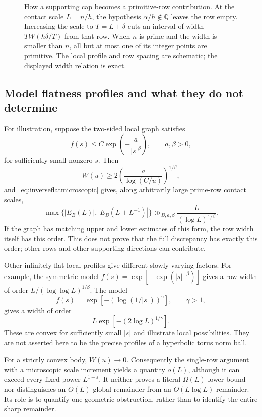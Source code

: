 \documentclass[11pt,a4paper]{article}
\numberwithin{equation}{section}
\theoremstyle{definition}
\theoremstyle{remark}
\begin{document}
\begin{figure}[htbp]
\caption[A flat supporting cap and a primitive-row burst]{How a supporting cap becomes a primitive-row contribution.
At the contact scale $L=n/h$, the hypothesis $\alpha/h\notin\mathbb Q$
leaves the row empty. Increasing the scale to $T=L+\delta$ cuts an interval
of width $TW(h\delta/T)$ from that row. When $n$ is prime and the width
is smaller than $n$, all but at most one of its integer points are
primitive. The local profile and row spacing are schematic; the
displayed width relation is exact.}
\label{fig:mono-flat-row}
\end{figure}

\subsection{Model flatness profiles and what they do not determine}
\label{subsec:flatnessmodels}

For illustration, suppose the two-sided local graph satisfies
\[
 f(s)\leq C\exp\!\left(-\frac a{|s|^\beta}\right),
 \qquad a,\beta>0,
\]
for sufficiently small nonzero $s$. Then
\[
 W(u)\geq
 2\left(\frac a{\log(C/u)}\right)^{1/\beta},
\]
and~\eqref{eq:inverseflatmicroscopic} gives, along arbitrarily large
prime-row contact scales,
\begin{equation}
 \max\{|E_B(L)|,|E_B(L+L^{-1})|\}
 \gg_{B,a,\beta}\frac L{(\log L)^{1/\beta}}.
 \label{eq:exponentialflatrow}
\end{equation}
If the graph has matching upper and lower estimates of this form, the
row width itself has this order. This does not prove that the full
discrepancy has exactly this order; other rows and other supporting
directions can contribute.

Other infinitely flat local profiles give different slowly varying
factors. For example, the symmetric model
$f(s)=\exp[-\exp(|s|^{-\beta})]$ gives a row width of order
$L/(\log\log L)^{1/\beta}$. The model
\[
 f(s)=\exp[-(\log(1/|s|))^\gamma],\qquad\gamma>1,
\]
gives a width of order
\[
 L\exp[-(2\log L)^{1/\gamma}].
\]
These are convex for sufficiently small $|s|$ and illustrate local
possibilities. They are not asserted here to be the precise profiles
of a hyperbolic torus norm ball.

For a strictly convex body, $W(u)\to0$. Consequently the single-row
argument with a microscopic scale increment yields a quantity $o(L)$,
although it can exceed every fixed power $L^{1-\varepsilon}$.
It neither proves a literal $\Omega(L)$ lower bound nor distinguishes
an $O(L)$ global remainder from an $O(L\log L)$ remainder. Its role is
to quantify one geometric obstruction, rather than to identify the
entire sharp remainder.
\end{document}
